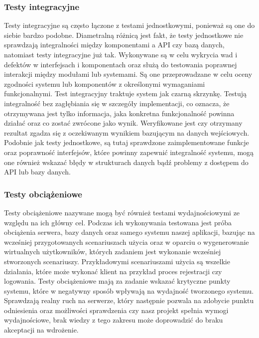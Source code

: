 \documentclass[oneside,polski,logo]{amuthesis}
\begin{document}
\subsubsection {Testy integracyjne}
Testy integracyjne są często łączone z testami jednostkowymi, ponieważ są one do siebie bardzo podobne. Diametralną różnicą jest fakt, że testy jednostkowe nie sprawdzają integralności między komponentami a API czy bazą danych, natomiast testy integracyjne już tak. Wykonywane są w celu wykrycia wad i defektów w interfejsach i komponentach oraz służą do testowania poprawnej interakcji między modułami lub systemami. Są one przeprowadzane w celu oceny zgodności systemu lub komponentów z określonymi wymaganiami funkcjonalnymi. Test integracyjny traktuje system jak czarną skrzynkę. Testują integralność bez zagłębiania się w szczegóły implementacji, co oznacza, że otrzymywana jest tylko informacja, jaka konkretna funkcjonalność powinna działać oraz co zostać zwrócone jako wynik. Weryfikowane jest czy otrzymany rezultat zgadza się z oczekiwanym wynikiem bazującym na danych wejściowych. Podobnie jak testy jednostkowe, są tutaj sprawdzone zaimplementowane funkcje oraz poprawność interfejsów, które powinny zapewnić integralność systemu, mogą one również wskazać błędy w strukturach danych bądź problemy z dostępem do API lub bazy danych.\cite{testI}\\

\subsubsection {Testy obciążeniowe}
Testy obciążeniowe nazywane mogą być również testami wydajnościowymi ze względu na ich główny cel. Podczas ich wykonywania testowana jest próba obciążenia serwera, bazy danych oraz samego systemu naszej aplikacji, bazując na wcześniej przygotowanych scenariuszach użycia oraz w oparciu o wygenerowanie wirtualnych użytkowników, których zadaniem jest wykonanie wcześniej stworzonych scenariuszy. Przykładowymi scenariuszami użycia są wszelkie działania, które może wykonać klient na przykład proces rejestracji czy logowania. Testy obciążeniowe mają za zadanie wskazać krytyczne punkty systemu, które w negatywny sposób wpływają na wydajność tworzonego systemu. Sprawdzają realny ruch na serwerze, który następnie pozwala na zdobycie punktu odniesienia oraz możliwości sprawdzenia czy nasz projekt spełnia wymogi wydajnościowe, brak wiedzy z tego zakresu może doprowadzić do braku akceptacji na wdrożenie.\cite{testO}\\
\end{document}
